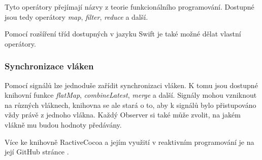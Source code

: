 Tyto operátory přejímají názvy z teorie funkcionálního programování.
Dostupné jsou tedy operátory \textit{map}, \textit{filter}, \textit{reduce} a další.

Pomocí rozšíření tříd dostupných v jazyku Swift je také možné dělat vlastní operátory.

\subsubsection*{Synchronizace vláken}

Pomocí signálů lze jednoduše zařídit synchronizaci vláken.
K tomu jsou dostupné knihovní funkce \textit{flatMap}, \textit{combineLatest}, \textit{merge} a další.
Signály mohou vzniknout na různých vláknech, knihovna se ale stará o to, aby k signálů bylo přistupováno vždy právě z jednoho vlákna.
Každý Observer si také může zvolit, na jakém vlákně mu budou hodnoty předávány.

Více ke knihovně RactiveCocoa a jejím využití v reaktivním programování je na její GitHub stránce \cite{github-reactivecocoa}.
